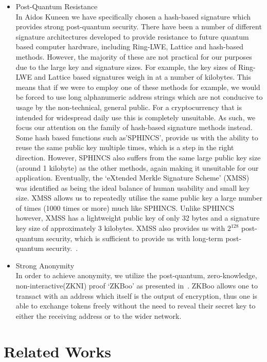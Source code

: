 \documentclass[a4paper,10pt,twocolumn]{article}
\begin{document}
\begin{itemize}
\item{Post-Quantum Resistance}\mbox{}\\ 
In Aidos Kuneen we have specifically chosen a hash-based signature which provides strong post-quantum security. There have been a 
number of different signature architectures developed to provide resistance to future quantum based computer hardware, including 
Ring-LWE, Lattice and hash-based methods. However, the majority of these are not practical for our purposes due to the large key and 
signature sizes. For example, the key sizes of Ring-LWE and Lattice based signatures weigh in at a number of kilobytes. This means that 
if we were to employ one of these methods for example, we would be forced to use long alphanumeric address strings which are not 
conducive to usage by the non-technical, general public. For a cryptocurrency that is intended for widespread daily use this is 
completely unsuitable. As such, we focus our attention on the family of hash-based signature methods instead. Some hash based functions 
such as'SPHINCS', provide us with the ability to reuse the same public key multiple times, which is a step in the right direction. 
However, SPHINCS also suffers from the same large public key size (around 1 kilobyte) as the other methods, again making it unsuitable 
for our application. Eventually, the `eXtended Merkle Signature Scheme' (XMSS) was identified as being the ideal balance of human 
usability and small key size. XMSS allows us to repeatedly utilise the same public key a large number of times (1000 times or more) much 
like SPHINCS. Unlike SPHINCS however, XMSS has a lightweight public key of only 32 bytes and a signature key size of approximately 3 
kilobytes. XMSS also provides us with \( 2^{128} \) post-quantum security, which is sufficient to provide us with long-term post-quantum 
security.~\cite{recom}.

\item{Strong Anonymity}\mbox{}\\ 
In order to achieve anonymity, we utilize the post-quantum, zero-knowledge, non-interactive(ZKNI) proof `ZKBoo' as presented 
in~\cite{zkboo}. ZKBoo allows one to transact with an address which itself is the output of encryption, thus one is able to exchange 
tokens freely without the need to reveal their secret key to either the receiving address or to the wider network.
\end{itemize}

\section{Related Works}
\end{document}
